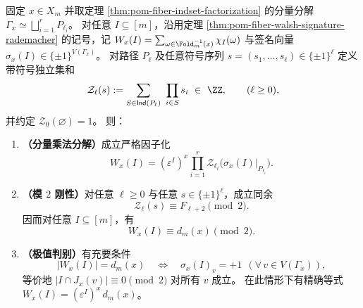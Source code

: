 \begin{theorem}\label{thm:pom-fiber-walsh-mod2-rigidity-extremal}
固定 \(x\in X_m\) 并取定理 \ref{thm:pom-fiber-indset-factorization} 的分量分解
\(
\Gamma_x\simeq\bigsqcup_{i=1}^{r}P_{\ell_i}
\)。
对任意 \(I\subseteq[m]\)，沿用定理 \ref{thm:pom-fiber-walsh-signature-rademacher} 的记号，记
\(
W_x(I)=\sum_{\omega\in\Fold_m^{-1}(x)}\chi_I(\omega)
\)
与签名向量 \(\sigma_x(I)\in\{\pm1\}^{V(\Gamma_x)}\)。
对路径 \(P_\ell\) 及任意符号序列 \(s=(s_1,\dots,s_\ell)\in\{\pm1\}^{\ell}\) 定义带符号独立集和
\[
\mathcal Z_\ell(s):=\sum_{S\in\mathsf{Ind}(P_\ell)}\ \prod_{i\in S}s_i\ \in\ \ZZ,
\qquad(\ell\ge 0),
\]
并约定 \(\mathcal Z_0(\varnothing)=1\)。
则：
\begin{enumerate}
  \item \textbf{（分量乘法分解）}成立严格因子化
  \[
  W_x(I)=(\varepsilon^I)^x \prod_{i=1}^{r}\mathcal Z_{\ell_i}\!\bigl(\sigma_x(I)\big|_{P_{\ell_i}}\bigr).
  \]
  \item \textbf{（模 \(2\) 刚性）}对任意 \(\ell\ge 0\) 与任意 \(s\in\{\pm1\}^{\ell}\)，成立同余
  \[
  \mathcal Z_\ell(s)\equiv F_{\ell+2}\pmod 2.
  \]
  因而对任意 \(I\subseteq[m]\)，有
  \[
  W_x(I)\equiv d_m(x)\pmod 2.
  \]
  \item \textbf{（极值判别）}有充要条件
  \[
  |W_x(I)|=d_m(x)
  \quad\Longleftrightarrow\quad
  \sigma_x(I)_v=+1\ \ (\forall\,v\in V(\Gamma_x)),
  \]
  等价地
  \(
  |I\cap J_x(v)|\equiv 0\pmod 2
  \)
  对所有 \(v\) 成立。
  在此情形下有精确等式 \(W_x(I)=(\varepsilon^I)^x\,d_m(x)\)。
\end{enumerate}
\end{theorem}
